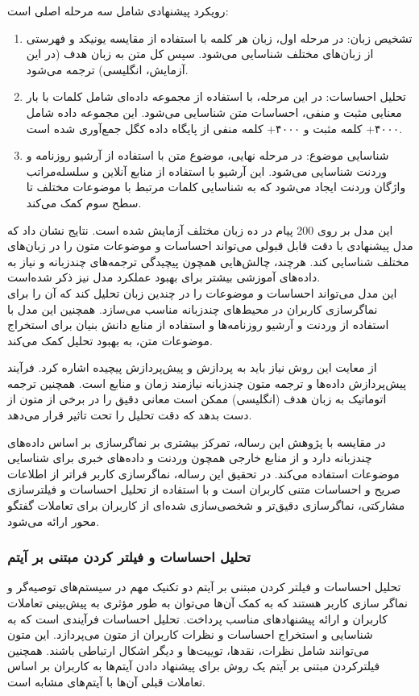 رویکرد پیشنهادی شامل سه مرحله اصلی است:
\begin{enumerate}
\item
تشخیص زبان: در مرحله اول، زبان هر کلمه با استفاده از مقایسه 
یونیکد%
 و فهرستی از زبان‌های مختلف شناسایی می‌شود. سپس کل متن به زبان هدف (در این آزمایش، انگلیسی) ترجمه می‌شود.
\item
تحلیل احساسات: در این مرحله، با استفاده از مجموعه داده‌ای شامل کلمات با بار معنایی مثبت و منفی، احساسات متن شناسایی می‌شود. این مجموعه داده شامل ۴۰۰۰+ کلمه مثبت و ۴۰۰۰+ کلمه منفی از پایگاه داده 
کگل%
جمع‌آوری شده است.
\item
شناسایی موضوع: در مرحله نهایی، موضوع متن با استفاده از آرشیو روزنامه و وردنت شناسایی می‌شود. این آرشیو با استفاده از منابع آنلاین و سلسله‌مراتب واژگان وردنت ایجاد می‌شود که به شناسایی کلمات مرتبط با موضوعات مختلف تا سطح سوم کمک می‌کند.
\end{enumerate}
این مدل بر روی 200 پیام در ده زبان مختلف آزمایش شده است.
نتایج نشان داد که مدل پیشنهادی با دقت قابل قبولی می‌تواند احساسات و موضوعات متون را در زبان‌های مختلف شناسایی کند. هرچند، چالش‌هایی همچون پیچیدگی ترجمه‌های چندزبانه و نیاز به داده‌های آموزشی بیشتر برای بهبود عملکرد مدل نیز ذکر شده‌است.\\

این مدل می‌تواند احساسات و موضوعات را در چندین زبان تحلیل کند که آن را برای نماگر‌سازی کاربران در محیط‌های چندزبانه مناسب می‌سازد.
همچنین این مدل با استفاده از وردنت و آرشیو روزنامه‌ها و استفاده از منابع دانش بنیان برای استخراج موضوعات متن، به بهبود تحلیل کمک می‌کند.

از معایت این روش نیاز باید به پردازش و پیش‌پردازش پیچیده اشاره کرد. فرآیند پیش‌پردازش داده‌ها و ترجمه متون چندزبانه نیازمند زمان و منابع است. همچنین ترجمه اتوماتیک به زبان هدف (انگلیسی) ممکن است معانی دقیق را در برخی از متون از دست بدهد که دقت تحلیل را تحت تاثیر قرار می‌دهد.

در مقایسه با پژوهش این رساله،
\cite{nag2023knowledge}
 تمرکز بیشتری بر نماگر‌سازی بر اساس داده‌های چندزبانه دارد و از منابع خارجی همچون وردنت و داده‌های خبری برای شناسایی موضوعات استفاده می‌کند. در تحقیق این رساله، نماگر‌سازی کاربر فراتر از اطلاعات صریح و احساسات متنی کاربران است و با استفاده از تحلیل احساسات و فیلترسازی مشارکتی، نماگر‌سازی دقیق‌تر و شخصی‌سازی شده‌ای از کاربران برای تعاملات گفتگو محور ارائه می‌شود.



\subsubsection{تحلیل احساسات و فیلتر کردن مبتنی بر آیتم}
تحلیل احساسات و فیلتر کردن مبتنی بر آیتم دو تکنیک مهم در سیستم‌های توصیه‌گر و نماگر سازی کاربر هستند که به کمک آن‌ها می‌توان به طور مؤثری به پیش‌بینی تعاملات کاربران و ارائه پیشنهادهای مناسب پرداخت. 
تحلیل احساسات فرآیندی است که به شناسایی و استخراج احساسات و نظرات کاربران از متون می‌پردازد. این متون می‌توانند شامل نظرات، نقدها، توییت‌ها و دیگر اشکال ارتباطی باشند. همچنین فیلترکردن مبتنی بر آیتم یک روش برای پیشنهاد دادن آیتم‌ها به کاربران بر اساس تعاملات قبلی آن‌ها با آیتم‌های مشابه است.


